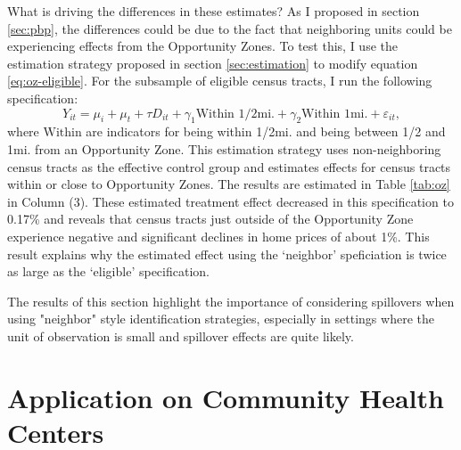 \documentclass[11pt]{article}
\begin{document}
What is driving the differences in these estimates? As I proposed in section \ref{sec:pbp}, the differences could be due to the fact that neighboring units could be experiencing effects from the Opportunity Zones. To test this, I use the estimation strategy proposed in section \ref{sec:estimation} to modify equation \ref{eq:oz-eligible}. For the subsample of eligible census tracts, I run the following specification: 
\begin{equation}\label{eq:oz-spill}
    Y_{it} = \mu_i + \mu_t + \tau D_{it} + \gamma_{1} \text{Within 1/2mi.} +  \gamma_{2} \text{Within 1mi.} + \varepsilon_{it},
\end{equation}
where $\text{Within}$ are indicators for being within 1/2mi. and being between 1/2 and 1mi. from an Opportunity Zone. This estimation strategy uses non-neighboring census tracts as the effective control group and estimates effects for census tracts within or close to Opportunity Zones. The results are estimated in Table \ref{tab:oz} in Column (3). These estimated treatment effect decreased in this specification to 0.17\% and reveals that census tracts just outside of the Opportunity Zone experience negative and significant declines in home prices of about 1\%. This result explains why the estimated effect using the `neighbor' speficiation is twice as large as the `eligible' specification. 

The results of this section highlight the importance of considering spillovers when using "neighbor" style identification strategies, especially in settings where the unit of observation is small and spillover effects are quite likely. 


\section{Application on Community Health Centers}\label{sec:chc}
\end{document}

